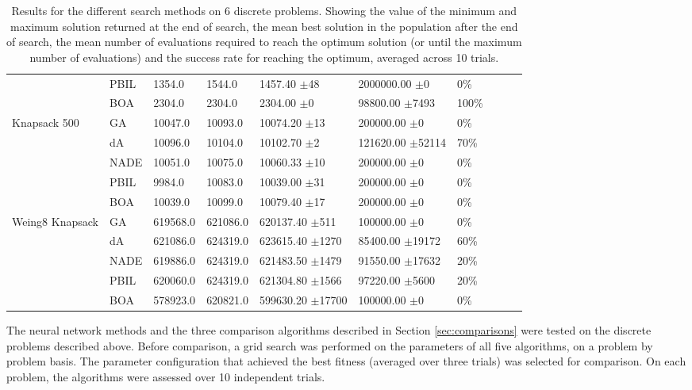 \documentclass[twoside]{article}
\begin{document}
\begin{table}[t!]
{\begin{tabular}{ | p{1.8cm} | l | l | l | l | l | l | l | l | p{1cm} |}
 & PBIL & 1354.0 & 1544.0 & 1457.40 \(\pm\)48 & 2000000.00 \(\pm\)0 & 0\%\\
 & BOA & 2304.0 & 2304.0 & 2304.00 \(\pm\)0 & 98800.00 \(\pm\)7493 & 100\%\\\hline
Knapsack 500 & GA & 10047.0 & 10093.0 & 10074.20 \(\pm\)13 & 200000.00 \(\pm\)0 & 0\%\\
 & dA & 10096.0 & 10104.0 & 10102.70 \(\pm\)2 & 121620.00 \(\pm\)52114 & 70\%\\
 & NADE & 10051.0 & 10075.0 & 10060.33 \(\pm\)10 & 200000.00 \(\pm\)0 & 0\%\\
 & PBIL & 9984.0 & 10083.0 & 10039.00 \(\pm\)31 & 200000.00 \(\pm\)0 & 0\%\\
 & BOA & 10039.0 & 10099.0 & 10079.40 \(\pm\)17 & 200000.00 \(\pm\)0 & 0\%\\\hline
Weing8 Knapsack & GA & 619568.0 & 621086.0 & 620137.40 \(\pm\)511 & 100000.00 \(\pm\)0 & 0\%\\
 & dA & 621086.0 & 624319.0 & 623615.40 \(\pm\)1270 & 85400.00 \(\pm\)19172 & 60\%\\
 & NADE & 619886.0 & 624319.0 & 621483.50 \(\pm\)1479 & 91550.00 \(\pm\)17632 & 20\%\\
 & PBIL & 620060.0 & 624319.0 & 621304.80 \(\pm\)1566 & 97220.00 \(\pm\)5600 & 20\%\\
 & BOA & 578923.0 & 620821.0 & 599630.20 \(\pm\)17700 & 100000.00 \(\pm\)0 & 0\%\\\hline
    \end{tabular}
    }
    \caption{Results for the different search methods on 6 discrete problems. Showing the value of the minimum and maximum solution returned at the end of search, the mean best solution in the population after the end of search, the mean number of evaluations required to reach the optimum solution (or until the maximum number of evaluations) and the success rate for reaching the optimum, averaged across 10 trials.}
        \label{table:main_results}

\end{table}

The neural network methods and the three comparison algorithms described in Section \ref{sec:comparisons} were tested on the discrete problems described above. Before comparison, a grid search was performed on the parameters of all five algorithms, on a problem by problem basis. The parameter configuration that achieved the best fitness (averaged over three trials) was selected for comparison. On each problem, the algorithms were assessed over 10 independent trials.
 
\end{document}
